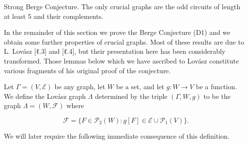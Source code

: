 Strong Berge Conjecture. The only crucial graphs are the odd circuits of length at least 5 and their complements.

In the remainder of this section we prove the Berge Conjecture (D1) and we obtain some further properties of crucial graphs. Most of these results are due to L. Lovász [ℓ.3] and [ℓ.4], but their presentation here has been considerably transformed. Those lemmas below which we have ascribed to Lovász constitute various fragments of his original proof of the conjecture.

Let $\Gamma = (V, \mathcal{E})$ be any graph, let $W$ be a set, and let $g: W \rightarrow V$ be a function. We define the Lovász graph $\Lambda$ determined by the triple $(\Gamma, W, g)$ to be the graph $\Lambda = (W, \mathcal{F})$ where

$$\mathcal{F} = \{F \in \mathcal{P}_2(W) : g[F] \in \mathcal{E} \cup \mathcal{P}_1(V)\}.$$

We will later require the following immediate consequence of this definition.

